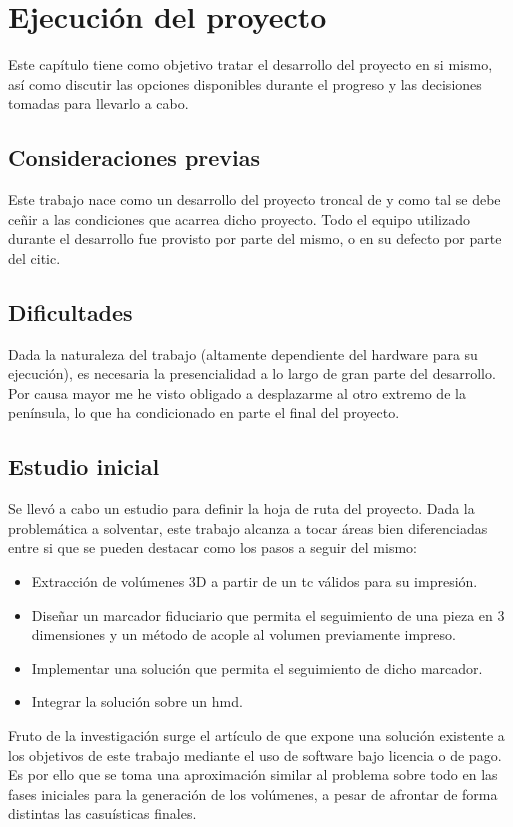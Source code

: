 \chapter{Ejecución del proyecto}
\label{chap:edp}
Este capítulo tiene como objetivo tratar el desarrollo del proyecto en si mismo, así como discutir las opciones disponibles durante el progreso y las decisiones tomadas para llevarlo a cabo.
\section{Consideraciones previas}
Este trabajo nace como un desarrollo del proyecto troncal de \citeauthor{IglesiasGuitian2022} y como tal se debe ceñir a las condiciones que acarrea dicho proyecto.
Todo el equipo utilizado durante el desarrollo fue provisto por parte del mismo, o en su defecto por parte del \acrfull{citic}.
\section{Dificultades}
Dada la naturaleza del trabajo (altamente dependiente del hardware para su ejecución), es necesaria la presencialidad a lo largo de gran parte del desarrollo. Por causa mayor me he visto obligado a desplazarme al otro extremo de la península, lo que ha condicionado en parte el final del proyecto.
\section{Estudio inicial}
Se llevó a cabo un estudio para definir la hoja de ruta del proyecto. Dada la problemática a solventar, este trabajo alcanza a tocar áreas bien diferenciadas entre si que se pueden destacar como los pasos a seguir del mismo:
\begin{itemize}
    \item Extracción de volúmenes 3D a partir de un \acrshort{tc} válidos para su impresión.
    \item Diseñar un marcador fiduciario que permita el seguimiento de una pieza en 3 dimensiones y un método de acople al volumen previamente impreso.
    \item Implementar una solución que permita el seguimiento de dicho marcador.
    \item Integrar la solución sobre un \acrshort{hmd}.
\end{itemize}

Fruto de la investigación surge el artículo de  \citeauthor{MoretaMartinez2020} que expone una solución existente a los objetivos de este trabajo mediante el uso de software bajo licencia o de pago.  Es por ello que se toma una aproximación similar al problema sobre todo en las fases iniciales para la generación de los volúmenes, a pesar de afrontar de forma distintas las casuísticas finales.
